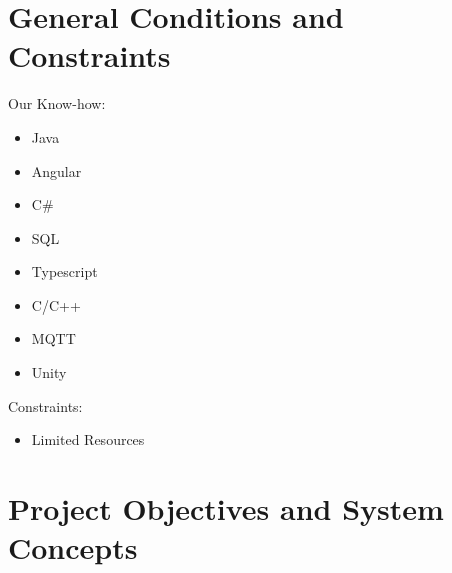 \documentclass[12pt]{article}
\theoremstyle{definition}
\begin{document}
\pagebreak

\section{General Conditions and Constraints}

Our Know-how:
\begin{itemize}
	\item Java
	\item Angular
	\item C#
	\item SQL
	\item Typescript
	\item C/C++
	\item MQTT
	\item Unity
\end{itemize}
\newline
Constraints:
\begin{itemize}
	\item Limited Resources
\end{itemize}

\pagebreak

\section{Project Objectives and System Concepts}
\end{document}

